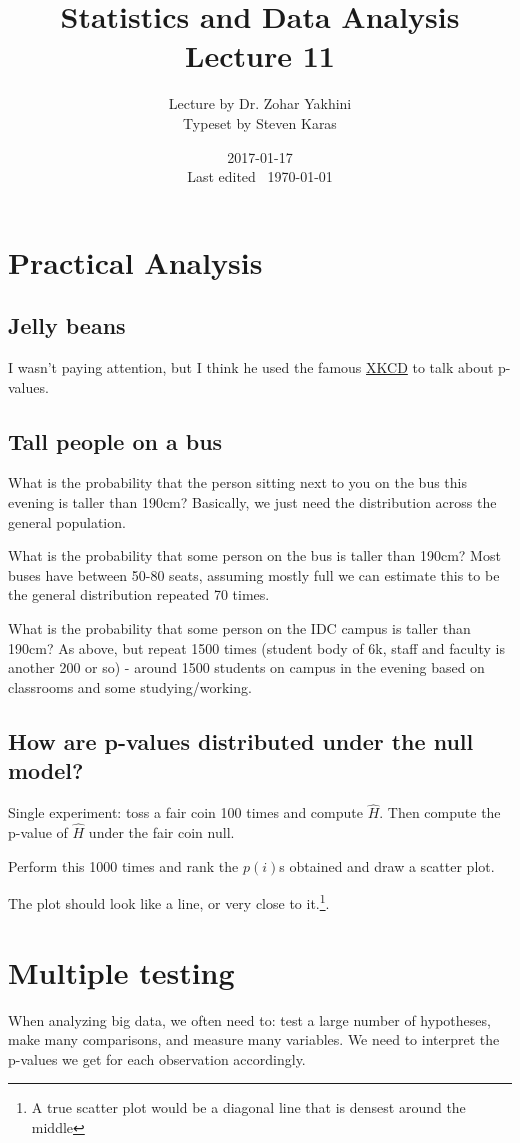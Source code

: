\documentclass[a4paper]{article}
\title{Statistics and Data Analysis\\\large Lecture 11}
\date{2017-01-17 \\ Last edited \currenttime\ \today}
\author{Lecture by Dr. Zohar Yakhini\\Typeset by Steven Karas}
\begin{document}
\maketitle

\section{Practical Analysis}

\subsection{Jelly beans}

I wasn't paying attention, but I think he used the famous \href{https://xkcd.com/882/}{XKCD} to talk about p-values.

\subsection{Tall people on a bus}
What is the probability that the person sitting next to you on the bus this evening is taller than 190cm?
Basically, we just need the distribution across the general population.

What is the probability that some person on the bus is taller than 190cm?
Most buses have between 50-80 seats, assuming mostly full we can estimate this to be the general distribution repeated 70 times.

What is the probability that some person on the IDC campus is taller than 190cm?
As above, but repeat 1500 times (student body of 6k, staff and faculty is another 200 or so) - around 1500 students on campus in the evening based on classrooms and some studying/working.

\subsection{How are p-values distributed under the null model?}
Single experiment: toss a fair coin 100 times and compute $\hat{H}$. Then compute the p-value of $\hat{H}$ under the fair coin null.

Perform this 1000 times and rank the $p(i)$s obtained and draw a scatter plot.

The plot should look like a line, or very close to it.\footnote{A true scatter plot would be a diagonal line that is densest around the middle}.

\section{Multiple testing}
When analyzing big data, we often need to: test a large number of hypotheses, make many comparisons, and measure many variables.
We need to interpret the p-values we get for each observation accordingly.
\end{document}
